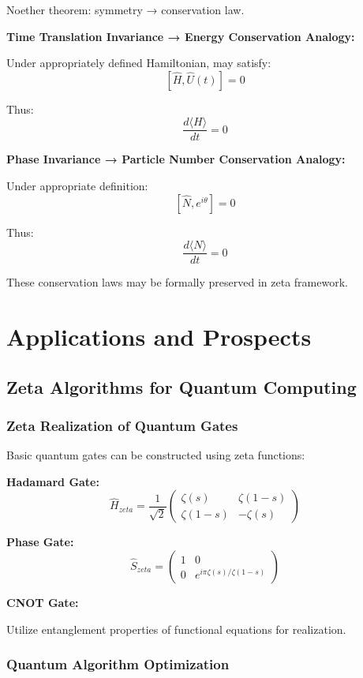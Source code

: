 \documentclass[11pt]{article}
\theoremstyle{plain}
\theoremstyle{definition}
\theoremstyle{remark}
\begin{document}
Noether theorem: symmetry → conservation law.

\textbf{Time Translation Invariance → Energy Conservation Analogy:}

Under appropriately defined Hamiltonian, may satisfy:
$$[\hat{H}, \hat{U}(t)] = 0$$

Thus:
$$\frac{d\langle H \rangle}{dt} = 0$$

\textbf{Phase Invariance → Particle Number Conservation Analogy:}

Under appropriate definition:
$$[\hat{N}, e^{i\theta}] = 0$$

Thus:
$$\frac{d\langle N \rangle}{dt} = 0$$

These conservation laws may be formally preserved in zeta framework.

\section{Applications and Prospects}

\subsection{Zeta Algorithms for Quantum Computing}

\subsubsection{Zeta Realization of Quantum Gates}

Basic quantum gates can be constructed using zeta functions:

\textbf{Hadamard Gate:}
$$\hat{H}_{zeta} = \frac{1}{\sqrt{2}} \begin{pmatrix} \zeta(s) & \zeta(1-s) \\ \zeta(1-s) & -\zeta(s) \end{pmatrix}$$

\textbf{Phase Gate:}
$$\hat{S}_{zeta} = \begin{pmatrix} 1 & 0 \\ 0 & e^{i\pi\zeta(s)/\zeta(1-s)} \end{pmatrix}$$

\textbf{CNOT Gate:}

Utilize entanglement properties of functional equations for realization.

\subsubsection{Quantum Algorithm Optimization}
\end{document}

